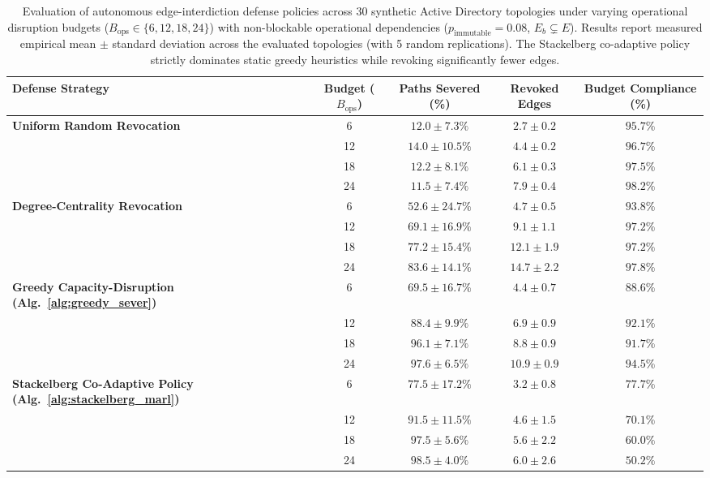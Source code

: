 \begin{table}[ht]
\centering
\caption{Evaluation of autonomous edge-interdiction defense policies across 30 synthetic Active Directory topologies under varying operational disruption budgets ($B_{\text{ops}} \in \{6, 12, 18, 24\}$) with non-blockable operational dependencies ($p_{\text{immutable}} = 0.08$, $E_b \subsetneq E$). Results report measured empirical mean $\pm$ standard deviation across the evaluated topologies (with 5 random replications). The Stackelberg co-adaptive policy strictly dominates static greedy heuristics while revoking significantly fewer edges.}
\label{tab:game_simulation_results}
\footnotesize
\begin{tabularx}{\textwidth}{Xcccc}
\toprule
\textbf{Defense Strategy} & \textbf{Budget ($B_{\text{ops}}$)} & \textbf{Paths Severed (\%)} & \textbf{Revoked Edges} & \textbf{Budget Compliance (\%)} \\
\midrule
\textbf{Uniform Random Revocation} 
    & 6  & $12.0 \pm 7.3\%$ & $2.7 \pm 0.2$  & $95.7\%$ \\
    & 12 & $14.0 \pm 10.5\%$ & $4.4 \pm 0.2$  & $96.7\%$ \\
    & 18 & $12.2 \pm 8.1\%$  & $6.1 \pm 0.3$  & $97.5\%$ \\
    & 24 & $11.5 \pm 7.4\%$  & $7.9 \pm 0.4$  & $98.2\%$ \\
\midrule
\textbf{Degree-Centrality Revocation} 
    & 6  & $52.6 \pm 24.7\%$ & $4.7 \pm 0.5$  & $93.8\%$ \\
    & 12 & $69.1 \pm 16.9\%$ & $9.1 \pm 1.1$  & $97.2\%$ \\
    & 18 & $77.2 \pm 15.4\%$ & $12.1 \pm 1.9$ & $97.2\%$ \\
    & 24 & $83.6 \pm 14.1\%$ & $14.7 \pm 2.2$ & $97.8\%$ \\
\midrule
\textbf{Greedy Capacity-Disruption (Alg.~\ref{alg:greedy_sever})} 
    & 6  & $69.5 \pm 16.7\%$ & $4.4 \pm 0.7$  & $88.6\%$ \\
    & 12 & $88.4 \pm 9.9\%$  & $6.9 \pm 0.9$  & $92.1\%$ \\
    & 18 & $96.1 \pm 7.1\%$  & $8.8 \pm 0.9$  & $91.7\%$ \\
    & 24 & $97.6 \pm 6.5\%$  & $10.9 \pm 0.9$ & $94.5\%$ \\
\midrule
\textbf{Stackelberg Co-Adaptive Policy (Alg.~\ref{alg:stackelberg_marl})} 
    & 6  & $\mathbf{77.5 \pm 17.2\%}$ & $\mathbf{3.2 \pm 0.8}$ & $77.7\%$ \\
    & 12 & $\mathbf{91.5 \pm 11.5\%}$  & $\mathbf{4.6 \pm 1.5}$ & $70.1\%$ \\
    & 18 & $\mathbf{97.5 \pm 5.6\%}$  & $\mathbf{5.6 \pm 2.2}$ & $60.0\%$ \\
    & 24 & $\mathbf{98.5 \pm 4.0\%}$  & $\mathbf{6.0 \pm 2.6}$ & $50.2\%$ \\
\bottomrule
\end{tabularx}
\end{table}

